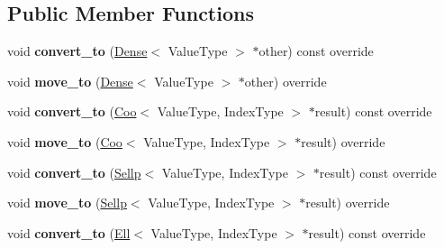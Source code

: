 \subsection*{Public Member Functions}
\begin{DoxyCompactItemize}
\item 
\mbox{\label{classgko_1_1matrix_1_1Csr_a610dfb71907ee0e79ca6470571cb1d10}} 
void {\bfseries convert\+\_\+to} (\hyperlink{classgko_1_1matrix_1_1Dense}{Dense}$<$ Value\+Type $>$ $\ast$other) const override
\item 
\mbox{\label{classgko_1_1matrix_1_1Csr_a794189da6f4443a991b7f68ed59c2f49}} 
void {\bfseries move\+\_\+to} (\hyperlink{classgko_1_1matrix_1_1Dense}{Dense}$<$ Value\+Type $>$ $\ast$other) override
\item 
\mbox{\label{classgko_1_1matrix_1_1Csr_ab0927bd9d5f77008d95891f266b9eb1d}} 
void {\bfseries convert\+\_\+to} (\hyperlink{classgko_1_1matrix_1_1Coo}{Coo}$<$ Value\+Type, Index\+Type $>$ $\ast$result) const override
\item 
\mbox{\label{classgko_1_1matrix_1_1Csr_a79c4a2730c1ef576d75fb8f2d98aecf2}} 
void {\bfseries move\+\_\+to} (\hyperlink{classgko_1_1matrix_1_1Coo}{Coo}$<$ Value\+Type, Index\+Type $>$ $\ast$result) override
\item 
\mbox{\label{classgko_1_1matrix_1_1Csr_aa7c16cb04e391ef7635e9b597ada39a3}} 
void {\bfseries convert\+\_\+to} (\hyperlink{classgko_1_1matrix_1_1Sellp}{Sellp}$<$ Value\+Type, Index\+Type $>$ $\ast$result) const override
\item 
\mbox{\label{classgko_1_1matrix_1_1Csr_ab5e533173f10bb8b0269ddf8374bfcff}} 
void {\bfseries move\+\_\+to} (\hyperlink{classgko_1_1matrix_1_1Sellp}{Sellp}$<$ Value\+Type, Index\+Type $>$ $\ast$result) override
\item 
\mbox{\label{classgko_1_1matrix_1_1Csr_a4c351ea53f42a6fd5792b38d786e2082}} 
void {\bfseries convert\+\_\+to} (\hyperlink{classgko_1_1matrix_1_1Ell}{Ell}$<$ Value\+Type, Index\+Type $>$ $\ast$result) const override
\item 

\end{DoxyCompactItemize}
